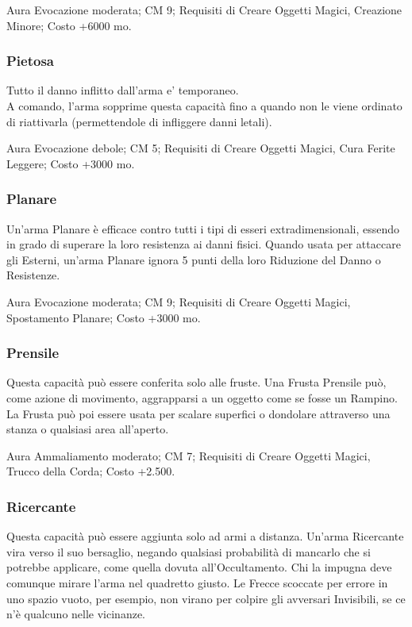 \begin{multicols}{2}
Aura Evocazione moderata; CM 9; Requisiti di Creare Oggetti Magici, Creazione Minore; Costo +6000 mo.

\subsubsection{Pietosa}

Tutto il danno inflitto dall'arma e' temporaneo.\\
A comando, l'arma sopprime questa capacità fino a quando non le viene ordinato di riattivarla (permettendole di infliggere danni letali).

Aura Evocazione debole; CM 5; Requisiti di Creare Oggetti Magici, Cura Ferite Leggere; Costo +3000 mo.

\subsubsection{Planare}

Un'arma Planare è efficace contro tutti i tipi di esseri extradimensionali, essendo in grado di superare la loro resistenza ai danni fisici. Quando usata per attaccare gli Esterni, un'arma Planare ignora 5 punti della loro Riduzione del Danno o Resistenze.

Aura Evocazione moderata; CM 9; Requisiti di Creare Oggetti Magici, Spostamento Planare; Costo +3000 mo.

\subsubsection{Prensile}

Questa capacità può essere conferita solo alle fruste. Una Frusta Prensile può, come azione di movimento, aggrapparsi a un oggetto come se fosse un Rampino. La Frusta può poi essere usata per scalare superfici o dondolare attraverso una stanza o qualsiasi area all'aperto. 

Aura Ammaliamento moderato; CM 7; Requisiti di Creare Oggetti Magici, Trucco della Corda; Costo +2.500.

\subsubsection{Ricercante}

Questa capacità può essere aggiunta solo ad armi a distanza. Un'arma Ricercante vira verso il suo bersaglio, negando qualsiasi probabilità di mancarlo che si potrebbe applicare, come quella dovuta all'Occultamento. Chi la impugna deve comunque mirare l'arma nel quadretto giusto. Le Frecce scoccate per errore in uno spazio vuoto, per esempio, non virano per colpire gli avversari Invisibili, se ce n'è qualcuno nelle vicinanze.


\end{multicols}
